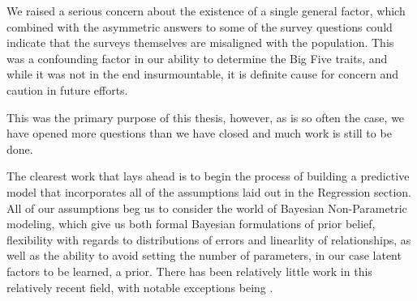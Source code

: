 \documentclass[a4paper,12pt]{article}
\begin{document}
We raised a serious concern about the existence of a single general factor, which combined with the asymmetric answers to some of the survey questions could indicate that the surveys themselves are misaligned with the population. This was a confounding factor in our ability to determine the Big Five traits, and while it was not in the end insurmountable, it is definite cause for concern and caution in future efforts.

This was the primary purpose of this thesis, however, as is so often the case, we have opened more questions than we have closed and much work is still to be done.

The clearest work that lays ahead is to begin the process of building a predictive model that incorporates all of the assumptions laid out in the Regression section. All of our assumptions beg us to consider the world of Bayesian Non-Parametric modeling, which give us both formal Bayesian formulations of prior belief, flexibility with regards to distributions of errors and linearlity of relationships, as well as the ability to avoid setting the number of parameters, in our case latent factors to be learned, a prior. There has been relatively little work in this relatively recent field, with notable exceptions being \cite{}.



\printbibliography
\end{document}
